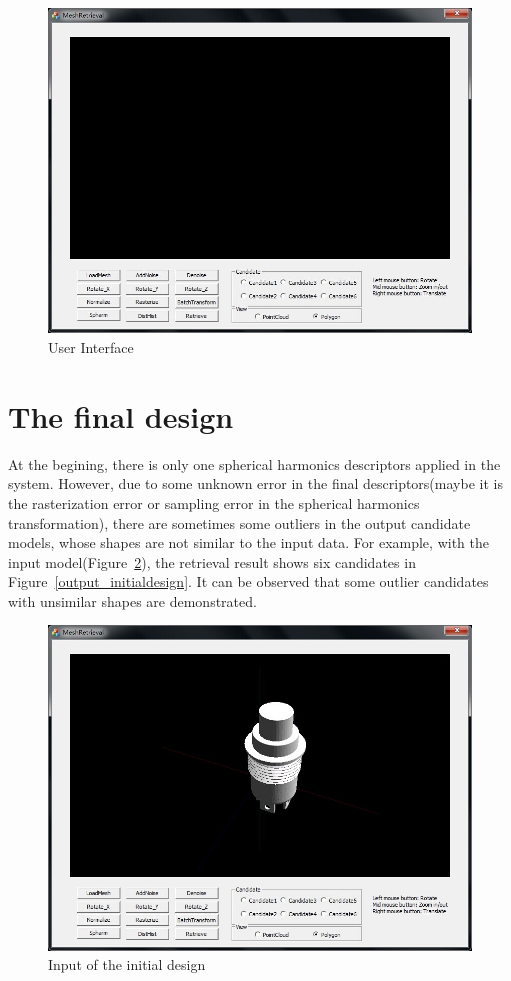 \begin{figure}[h]
\centering
\includegraphics[width=0.7\linewidth]{UI}
\caption{User Interface} \label{UI}
\end{figure}

\section{The final design}

At the begining, there is only one spherical harmonics descriptors applied in the system. However, due to some unknown error in the final descriptors(maybe it is the rasterization error or sampling error in the spherical harmonics transformation), there are sometimes some outliers in the output candidate models, whose shapes are not similar to the input data. For example, with the input model(Figure~\ref{input_initialdesign}), the retrieval result shows six candidates in Figure~\ref{output_initialdesign}. It can be observed that some outlier candidates with unsimilar shapes are demonstrated. 


\begin{figure}[h]
\centering
\includegraphics[width=0.7\linewidth]{input_initialdesign}
\caption{Input of the initial design} \label{input_initialdesign}
\end{figure}

